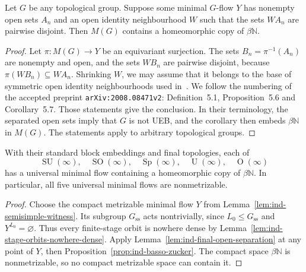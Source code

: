\begin{proposition}\label{prop:ind-basso-zucker}
Let $G$ be any topological group. Suppose some minimal $G$-flow $Y$
has nonempty open sets $A_n$ and an open identity neighbourhood $W$
such that the sets $WA_n$ are pairwise disjoint. Then $M(G)$ contains
a homeomorphic copy of $\beta\mathbb N$.
\end{proposition}

\begin{proof}
Let $\pi:M(G)\to Y$ be an equivariant surjection. The sets
$B_n=\pi^{-1}(A_n)$ are nonempty and open, and the sets $WB_n$ are
pairwise disjoint, because $\pi(WB_n)\subseteq WA_n$.
Shrinking $W$, we may assume that it belongs to the base of symmetric
open identity neighbourhoods used in~\cite{BassoZucker2021}.
We follow the numbering of the accepted preprint
\texttt{arXiv:2008.08471v2}: Definition~5.1, Proposition~5.6 and
Corollary~5.7. Those statements give the conclusion. In their
terminology, the separated open sets imply that $G$ is not UEB, and
the corollary then embeds $\beta\mathbb N$ in $M(G)$. The statements
apply to arbitrary topological groups.
\end{proof}

\begin{theorem}\label{thm:ind-classical-umf}
With their standard block embeddings and final topologies, each of
\[
\operatorname{SU}(\infty),\quad\operatorname{SO}(\infty),\quad\operatorname{Sp}(\infty),\quad
\operatorname{U}(\infty),\quad\operatorname{O}(\infty)
\]
has a universal minimal flow containing a homeomorphic copy of
$\beta\mathbb N$. In particular, all five universal minimal flows are
nonmetrizable.
\end{theorem}

\begin{proof}
Choose the compact metrizable minimal flow $Y$ from
Lemma~\ref{lem:ind-semisimple-witness}. Its subgroup $G_{\mathrm{ss}}$ acts nontrivially,
since $L_0\le G_{\mathrm{ss}}$ and $Y^{L_0}=\varnothing$. Thus every finite-stage
orbit is nowhere dense by Lemma~\ref{lem:ind-stage-orbits-nowhere-dense}.
Apply Lemma~\ref{lem:ind-final-open-separation} at any point of $Y$, then
Proposition~\ref{prop:ind-basso-zucker}. The compact space $\beta\mathbb N$ is
nonmetrizable, so no compact metrizable space can contain it.
\end{proof}

